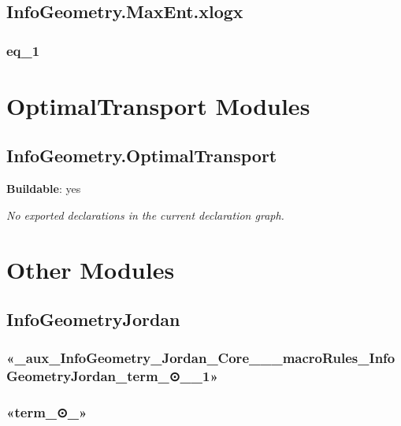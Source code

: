 \section{InfoGeometry.MaxEnt.xlogx}

\subsection*{eq_1}

\begin{theorem}[blueprint="infogeometry:maxent:xlogx:eq_1"]
\end{theorem}

\chapter{OptimalTransport Modules}

\section{InfoGeometry.OptimalTransport}

\noindent\textbf{Buildable}: yes

\noindent\emph{No exported declarations in the current declaration graph.}

\chapter{Other Modules}

\section{InfoGeometryJordan}

\subsection*{«_aux_InfoGeometry_Jordan_Core___macroRules_InfoGeometryJordan_term_⊙__1»}

\begin{theorem}[blueprint="infogeometryjordan:«_aux_infogeometry_jordan_core___macrorules_infogeometryjordan_term_⊙__1»"]
\end{theorem}

\subsection*{«term_⊙_»}

